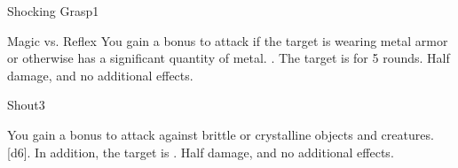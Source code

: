 \begin{spellsection}{Shocking Grasp}{1}
    \begin{spellheader}
    \end{spellheader}
    \begin{spellcontent}
        \begin{spelltargetinginfo}
        \end{spelltargetinginfo}
        \begin{spelleffects}
            \begin{spellattack}{Magic vs. Reflex}
                \spellspecial You gain a  bonus to attack if the target is wearing metal armor or otherwise has a significant quantity of metal.
                \spellsuccess {}.
                \spellcritical The target is \staggered for 5 rounds.
                \spellfailure Half damage, and no additional effects.
            \end{spellattack}
        \end{spelleffects}
    \end{spellcontent}
    \begin{spellfooter}
        \miscastexplode
    \end{spellfooter}
\end{spellsection}

\begin{spellsection}{Shout}{3}
    \begin{spellheader}
    \end{spellheader}
    \begin{spellcontent}
        \begin{spelltargetinginfo}
        \end{spelltargetinginfo}
        \begin{spelleffects}
            \spellspecial You gain a  bonus to attack against brittle or crystalline objects and creatures.
            \spellsuccess {}[d6]. In addition, the target is \deafened.
            \spellfailure Half damage, and no additional effects.
        \end{spelleffects}
    \end{spellcontent}
    \begin{spellfooter}
        \miscastexplode
    \end{spellfooter}
\end{spellsection}

